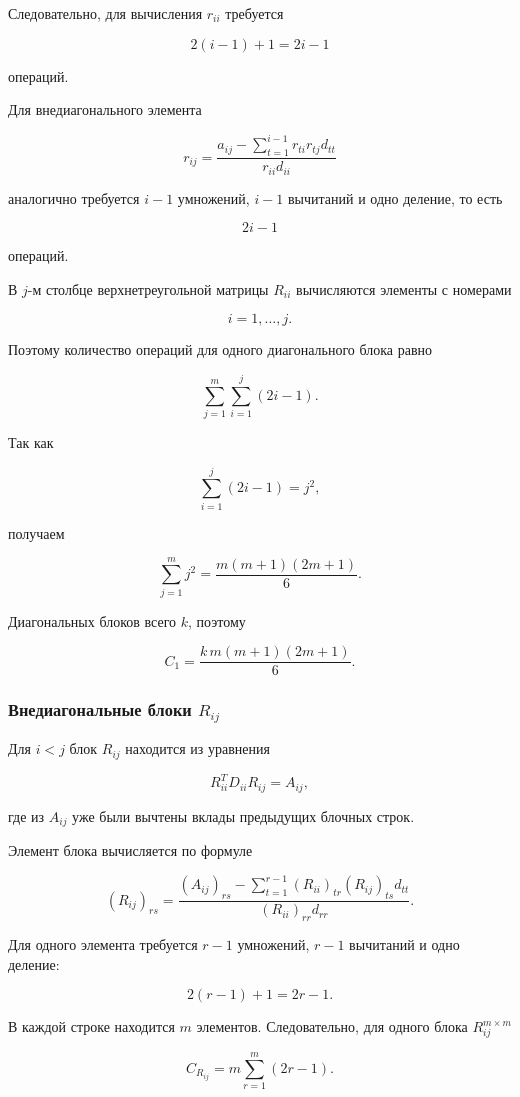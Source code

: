 \documentclass[a4paper,12pt]{article}
\begin{document}
Следовательно, для вычисления \(r_{ii}\) требуется

$$
2(i-1)+1=2i-1
$$

операций.

Для внедиагонального элемента

$$
r_{ij}
=
\frac{
  a_{ij}
  -
  \sum_{t=1}^{i-1}r_{ti}r_{tj}d_{tt}
}{
  r_{ii}d_{ii}
}
$$

аналогично требуется \(i-1\) умножений, \(i-1\) вычитаний и одно деление, то есть

$$
2i-1
$$

операций.

В \(j\)-м столбце верхнетреугольной матрицы \(R_{ii}\) вычисляются элементы с номерами

$$
i=1,\ldots,j.
$$

Поэтому количество операций для одного диагонального блока равно

$$
\sum_{j=1}^{m}\sum_{i=1}^{j}(2i-1).
$$

Так как

$$
\sum_{i=1}^{j}(2i-1)=j^2,
$$

получаем

$$
\sum_{j=1}^{m}j^2
=
\frac{m(m+1)(2m+1)}{6}.
$$

Диагональных блоков всего \(k\), поэтому

$$
C_1
=
\frac{k\,m(m+1)(2m+1)}{6}.
$$

\subsubsection{Внедиагональные блоки \(R_{ij}\)}

Для \(i<j\) блок \(R_{ij}\) находится из уравнения

$$
R_{ii}^{T}D_{ii}R_{ij}=A_{ij},
$$

где из \(A_{ij}\) уже были вычтены вклады предыдущих блочных строк.

Элемент блока вычисляется по формуле

$$
(R_{ij})_{rs}
=
\frac{
  (A_{ij})_{rs}
  -
  \sum_{t=1}^{r-1}
  (R_{ii})_{tr}(R_{ij})_{ts}d_{tt}
}{
  (R_{ii})_{rr}d_{rr}
}.
$$

Для одного элемента требуется \(r-1\) умножений, \(r-1\) вычитаний и одно деление:

$$
2(r-1)+1=2r-1.
$$

В каждой строке находится \(m\) элементов. Следовательно, для одного блока \(R_{ij}^{m\times m}\)

$$
C_{R_{ij}}
=
m\sum_{r=1}^{m}(2r-1).
$$
\end{document}
